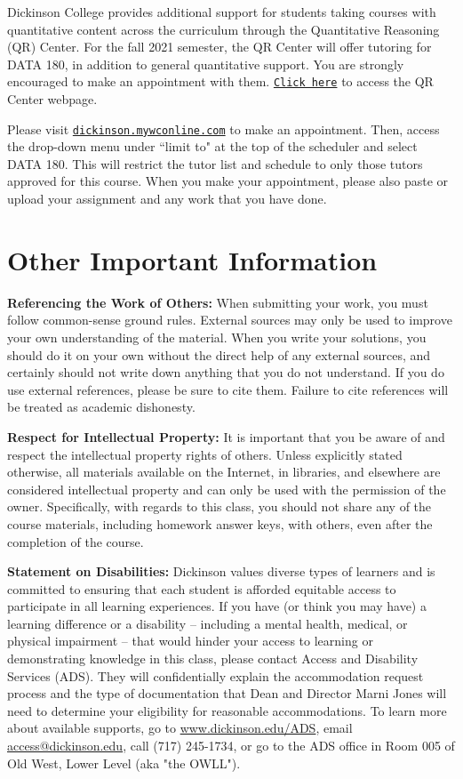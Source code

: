 \documentclass[11pt,letter]{article}
\begin{document}
Dickinson College provides additional support for students taking courses with quantitative content across the curriculum through the Quantitative Reasoning (QR) Center. For the fall 2021 semester, the QR Center will offer tutoring for DATA 180, in addition to general quantitative support. You are strongly encouraged to make an appointment with them. \href{https://www.dickinson.edu/info/20525/quantitative_reasoning_center/2962/quantitative_reasoning_center}{\texttt{Click here}} to access the QR Center webpage.

Please visit \href{https://dickinson.mywconline.com}{\texttt{dickinson.mywconline.com}} to make an appointment. Then, access the drop-down menu under ``limit to" at the top of the scheduler and select DATA 180. This will restrict the tutor list and schedule to only those tutors approved for this course. When you make your appointment, please also paste or upload your assignment and any work that you have done.


\section*{Other Important Information}

\textbf{Referencing the Work of Others:}  When submitting your work, you must follow common-sense ground rules.  External sources may only be used to improve your own understanding of the material.  When you write your solutions, you should do it on your own without the direct help of any external sources, and certainly should not write down anything that you do not understand. If you do use external references, please be sure to cite them.  Failure to cite references will be treated as academic dishonesty.

\textbf{Respect for Intellectual Property:} It is important that you be aware of and respect the intellectual property rights of others. Unless explicitly stated otherwise, all materials available on the Internet, in libraries, and elsewhere are considered intellectual property and can only be used with the permission of the owner. Specifically, with regards to this class, you should not share any of the course materials, including homework answer keys, with others, even after the completion of the course.

\textbf{Statement on Disabilities:} Dickinson values diverse types of learners and is committed to ensuring that each student is afforded equitable access to participate in all learning experiences. If you have (or think you may have) a learning difference or a disability -- including a mental health, medical, or physical impairment – that would hinder your access to learning or demonstrating knowledge in this class, please contact Access and Disability Services (ADS). They will confidentially explain the accommodation request process and the type of documentation that Dean and Director Marni Jones will need to determine your eligibility for reasonable accommodations. To learn more about available supports, go to \url{www.dickinson.edu/ADS}, email \url{access@dickinson.edu}, call (717) 245-1734, or go to the ADS office in Room 005 of Old West, Lower Level (aka "the OWLL").
\end{document}

